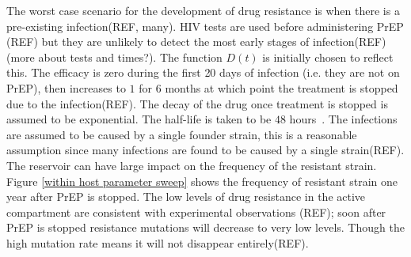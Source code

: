 \documentclass[DIV=15]{scrartcl}
\begin{document}

  
  





The worst case scenario for the development of drug resistance is  when there is a pre-existing infection(REF, many).  HIV tests are used before  administering PrEP (REF) but they are unlikely to detect the  most early stages of infection(REF)(more about tests and times?). The function $D(t)$ is initially chosen to reflect this. The efficacy  is zero during the first 20 days of infection (i.e. they are not on PrEP), then increases to $1$ for $6$ months at which point the treatment is stopped due to the infection(REF). The decay of the drug once treatment  is  stopped is assumed to be exponential. The half-life is taken to be 
$48$ hours~\cite{patterson2011}.   The  infections are assumed to be caused by a single founder strain, this is a reasonable assumption since many infections are found to  be caused by a single strain(REF). The reservoir can have large impact on the frequency of  the resistant strain. Figure \ref{within host parameter sweep} shows the frequency of resistant strain one year after PrEP  is stopped. The low levels of  drug resistance in the active compartment are consistent with experimental observations (REF); soon after PrEP is stopped resistance mutations will decrease to  very low levels. Though the high mutation rate means it will not disappear entirely(REF).
\end{document}
